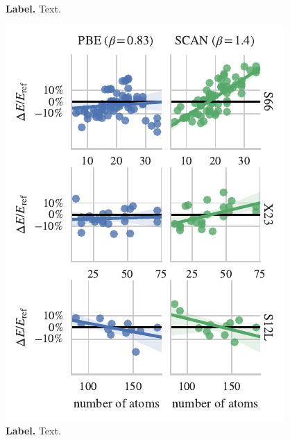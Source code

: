\begin{figure}
{
}
\caption{\textbf{Label.} Text.
}\label{fig:param-fitting}
\end{figure}

\begin{figure}
\centering
\includegraphics{../media/size-dependence}
\caption{\textbf{Label.} Text.
}\label{fig:size-dependence}
\end{figure}

